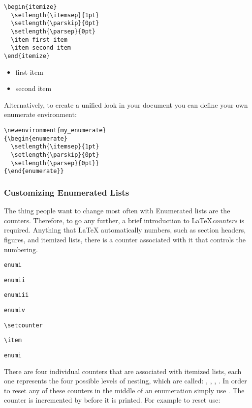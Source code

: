 \begin{lstlisting}
\begin{itemize}
  \setlength{\itemsep}{1pt}
  \setlength{\parskip}{0pt}
  \setlength{\parsep}{0pt}
  \item first item
  \item second item
\end{itemize}
\end{lstlisting}
\begin{itemize}
  \setlength{\itemsep}{1pt}
  \setlength{\parskip}{0pt}
  \setlength{\parsep}{0pt}
  \item first item
  \item second item
\end{itemize}

Alternatively, to create a unified look in your document you can define your
own enumerate environment:
\begin{lstlisting}
\newenvironment{my_enumerate}
{\begin{enumerate}
  \setlength{\itemsep}{1pt}
  \setlength{\parskip}{0pt}
  \setlength{\parsep}{0pt}}
{\end{enumerate}}
\end{lstlisting}
\newenvironment{my_enumerate}
{\begin{enumerate}
  \setlength{\itemsep}{1pt}
  \setlength{\parskip}{0pt}
  \setlength{\parsep}{0pt}}
{\end{enumerate}}
 
\subsubsection{Customizing Enumerated Lists}
The thing people want to change most often with Enumerated lists are the
counters. Therefore, to go any further, a brief introduction to
LaTeX\textit{counters} is required. Anything that LaTeX automatically numbers,
such as section headers, figures, and itemized lists, there is a counter
associated with it that controls the numbering. 
\begin{lstlisting}
enumi
\end{lstlisting}
  \begin{lstlisting}
enumii
\end{lstlisting}
  \begin{lstlisting}
enumiii
\end{lstlisting}
  \begin{lstlisting}
enumiv
\end{lstlisting}
  \begin{lstlisting}
\setcounter
\end{lstlisting}
  \begin{lstlisting}
\item
\end{lstlisting}
  \begin{lstlisting}
enumi
\end{lstlisting}
There are four individual counters that are associated with itemized lists,
each one represents the four possible levels of nesting, which are called: , ,
, . In order to reset any of these counters in the middle of an enumeration
simply use . The counter is incremented by  before it is printed. For example
to reset  use:

